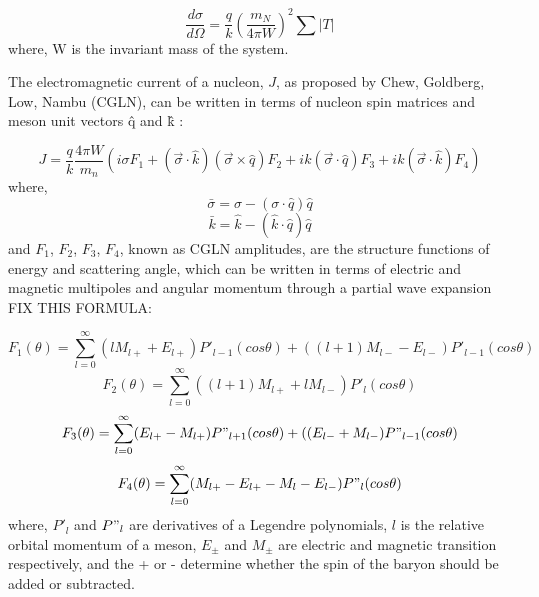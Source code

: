 \begin{equation}
\frac{d\sigma}{d\Omega}=\frac{q}{k}\left(\frac{m_{N}}{4\pi W}\right)^{2}\sum |T|
\end{equation}
where, W is the invariant mass of the system.

\indent The electromagnetic current of a nucleon, $J$, as proposed by Chew, Goldberg, Low, Nambu (CGLN), can be written in terms of nucleon spin matrices and meson unit vectors \^q and \^k \cite{chew}:

\begin{equation}
J=\frac{q}{k}\frac{4\pi W}{m_{n}}(i\sigma F_{1}+(\vec{\sigma} \cdot \hat{k})(\vec{\sigma} \times \hat{q})F_{2}+i k(\vec{\sigma} \cdot \hat{q})F_{3}+i k(\vec{\sigma} \cdot \hat{k})F_{4})
\end{equation}
where,
\begin{equation}
\bar{\sigma}=\sigma-(\sigma \cdot \hat{q})\hat{q}
\end{equation}
\begin{equation}
\bar{k}=\hat{k}-(\hat{k} \cdot \hat{q})\hat{q}
\end{equation}
and $F_{1}$, $F_{2}$, $F_{3}$, $F_{4}$, known as CGLN amplitudes, are the structure functions of energy and scattering angle, which can be written in terms of electric and magnetic multipoles and angular momentum through a partial wave expansion FIX THIS FORMULA:

\begin{equation}
F_{1}(\theta)=\sum\limits_{l=0}^{\infty} (lM_{l+}+E_{l+})P'_{l-1}(cos\theta)+((l+1)M_{l-}-E_{l-})P'_{l-1}(cos\theta)
\end{equation}
\begin{equation}
F_{2}(\theta)=\sum\limits_{l=0}^{\infty} ((l+1)M_{l+}+lM_{l-})P'_{l}(cos\theta)
\end{equation}
\begin{equation}
F_{3}(\theta)=\sum\limits_{l=0}^{\infty} (E_{l+}-M_{l+})P"_{l+1}(cos\theta)+((E_{l-}+M_{l-})P"_{l-1}(cos\theta)
\end{equation}
\begin{equation}
F_{4}(\theta)=\sum\limits_{l=0}^{\infty} (M_{l+}-E_{l+}-M_{l}-E_{l-})P"_{l}(cos\theta)
\end{equation}
where, $P'_{l}$ and $P"_{l}$ are derivatives of a Legendre polynomials, $l$ is the relative orbital momentum of a meson, $E_{\pm}$ and $M_{\pm}$ are electric and magnetic transition respectively, and the + or - determine whether the spin of the baryon should be added or subtracted.

